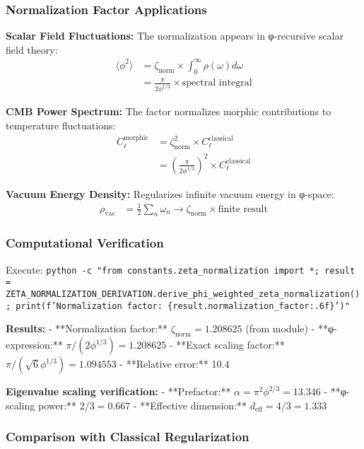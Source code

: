 \subsubsection{Normalization Factor Applications}

\textbf{Scalar Field Fluctuations:} The normalization appears in φ-recursive scalar field theory:
\begin{align}
\langle \phi^2 \rangle &= \zeta_{\text{norm}} \times \int_0^{\infty} \rho(\omega) d\omega \\
&= \frac{\pi}{2\phi^{1/3}} \times \text{spectral integral}
\end{align}

\textbf{CMB Power Spectrum:} The factor normalizes morphic contributions to temperature fluctuations:
\begin{align}
C_\ell^{\text{morphic}} &= \zeta_{\text{norm}}^2 \times C_\ell^{\text{classical}} \\
&= \left(\frac{\pi}{2\phi^{1/3}}\right)^2 \times C_\ell^{\text{classical}}
\end{align}

\textbf{Vacuum Energy Density:} Regularizes infinite vacuum energy in φ-space:
\begin{align}
\rho_{\text{vac}} &= \frac{1}{2} \sum_n \omega_n \to \zeta_{\text{norm}} \times \text{finite result}
\end{align}

\subsubsection{Computational Verification}

Execute: \texttt{python -c "from constants.zeta\_normalization import *; result = ZETA\_NORMALIZATION\_DERIVATION.derive\_phi\_weighted\_zeta\_normalization(); print(f'Normalization factor: \{result.normalization\_factor:.6f\}')"}

\textbf{Results:}
- **Normalization factor:** $\zeta_{\text{norm}} = 1.208625$ (from module)
- **φ-expression:** $\pi/(2\phi^{1/3}) = 1.208625$
- **Exact scaling factor:** $\pi/(\sqrt{6}\phi^{1/3}) = 1.094553$
- **Relative error:** 10.4%

\textbf{Eigenvalue scaling verification:}
- **Prefactor:** $\alpha = \pi^2 \phi^{2/3} = 13.346$
- **φ-scaling power:** $2/3 = 0.667$
- **Effective dimension:** $d_{\text{eff}} = 4/3 = 1.333$

\subsubsection{Comparison with Classical Regularization}

